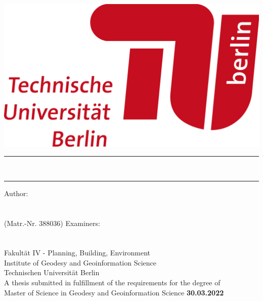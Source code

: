

    
\begin{titlepage}
    \begin{center}
        \includegraphics[width=.25\textwidth,right]{picture/image1.png}
            \\
        \vspace*{0.8cm}
        {\Huge %
            \rule[1 ex]{\textwidth}{2 pt} %
            \textbf{\printTitle}\\
            \rule[-1 ex]{\textwidth}{2 pt} %
            }
        \vfil
        {\Large Author:} \\[0.5cm]
        { %
            {\Large \textbf{\printAuthor}} \\[0.2cm] \\
            {(Matr.-Nr. 388036)}
            }
        \vfil
        {\Large Examiners: }\\ [0.5cm]
        { %
            {\Large \textbf{\printSupervisor}} \\[0.2cm]
            {\large \textbf{\printAffSupervisor}} \\[0.2cm]
            }
        \vfil
        {Fakult\"at IV - Planning, Building, Environment \\Institute of Geodesy and Geoinformation Science  \\ Technischen Universit\"at Berlin } \\[2 pt]
        \vfil
        {A thesis submitted in fulfillment of the requirements for the degree of \\ Master of Science in Geodesy and Geoinformation Science}
        \vfil
        {\large\textbf{30.03.2022} \printDate}
    \end{center}
\end{titlepage}

